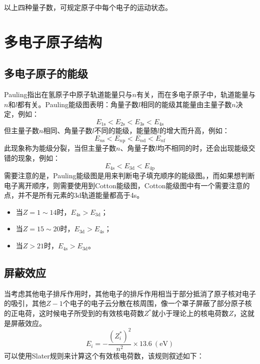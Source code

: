 \documentclass[
  10pt,
  twoside,
  openany,
  b5paper, %
  colorscheme = basic, %
]{qyxf-book}
\begin{document}
以上四种量子数，可规定原子中每个电子的运动状态。

\section{多电子原子结构}

\subsection{多电子原子的能级}

Pauling指出在氢原子中原子轨道能量只与$n$有关，而在多电子原子中，轨道能量与$n$和$l$都有关。Pauling能级图表明：角量子数$l$相同的能级其能量由主量子数$n$决定，例如：
\begin{equation*}
	E_\mathrm{1s} < E_\mathrm{2s} < E_\mathrm{3s} < E_\mathrm{4s}
\end{equation*}
但主量子数$n$相同、角量子数$l$不同的能级，能量随$l$的增大而升高，例如：
\begin{equation*}
	E_{n\mathrm{s}} < E_{n\mathrm{p}} < E_{n\mathrm{d}} < E_{n\mathrm{f}}
\end{equation*}
此现象称为能级分裂，当但主量子数$n$、角量子数$l$均不相同的时，还会出现能级交错的现象，例如：
\begin{equation*}
	E_\mathrm{4s} < E_\mathrm{3d} < E_\mathrm{4p} 
\end{equation*}
需要注意的是，Pauling能级图是用来判断电子填充顺序的能级图。，而如果想判断电子离开顺序，则需要使用到Cotton能级图，Cotton能级图中有一个需要注意的点，并不是所有元素的3d轨道能量都高于4s。
\begin{itemize}
	\item 当$Z = 1 \sim 14$时，$E_\mathrm{4s}>E_\mathrm{3d}$；
	\item 当$Z = 15 \sim 20$时，$E_\mathrm{3d}>E_\mathrm{4s}$；
	\item 当$Z > 21$时，$E_\mathrm{4s}>E_\mathrm{3d}$。
\end{itemize}

\subsection{屏蔽效应}
当考虑其他电子排斥作用时，其他电子的排斥作用相当于部分抵消了原子核对电子的吸引，其他$Z-1$个电子的电子云分散在核周围，像一个罩子屏蔽了部分原子核的正电荷，这时候电子所受到的有效核电荷数$Z^\ast $就小于理论上的核电荷数$Z$，这就是屏蔽效应。
\begin{equation*}
	E_i = -\frac{(Z^\ast_{i})^2}{n^2} \times 13.6 \ (\mathrm{eV})
\end{equation*}
可以使用Slater规则来计算这个有效核电荷数，该规则叙述如下：
\end{document}
